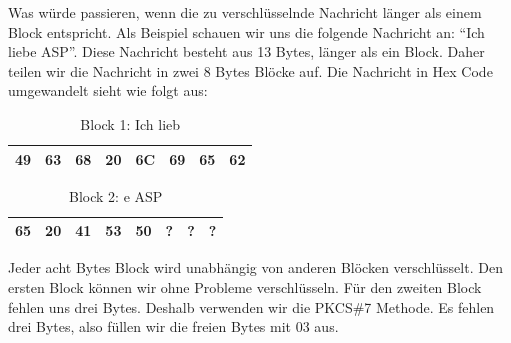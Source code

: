 \documentclass[course=asp]{aspdoc}
\begin{document}
Was würde passieren, wenn die zu verschlüsselnde Nachricht länger als einem Block entspricht. Als Beispiel schauen wir uns die folgende Nachricht an: “Ich liebe ASP”. Diese Nachricht besteht aus 13 Bytes, länger als ein Block. Daher teilen wir die Nachricht in zwei 8 Bytes Blöcke auf. Die Nachricht in Hex Code umgewandelt sieht wie folgt aus:
\begin{table}[H]
\centering
    \begin{tabular}{|l|l|l|l|l|l|l|l|}
        \hline
        49 & 63 & 68 & 20 & 6C & 69 & 65 & 62    \\
        \hline
    \end{tabular}
    \caption{Block 1: Ich lieb}
\end{table}

\begin{table}[H]
\centering
    \begin{tabular}{|l|l|l|l|l|l|l|l|}
        \hline
         65 & 20 & 41 & 53 & 50 & ?  & ? & ? \\
        \hline
    \end{tabular}
    \caption{Block 2: e ASP}
\end{table}

Jeder acht Bytes Block wird unabhängig von anderen Blöcken verschlüsselt. Den ersten Block können wir ohne Probleme verschlüsseln. Für den zweiten Block fehlen uns drei Bytes. Deshalb verwenden wir die PKCS\#7 Methode. Es fehlen drei Bytes, also füllen wir die freien Bytes mit 03 aus.
\end{document}
